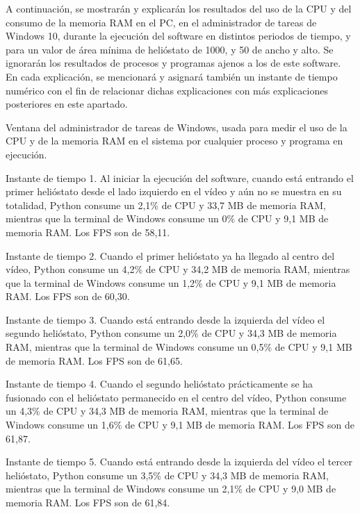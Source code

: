 \documentclass[12pt]{article}
\begin{document}
A continuación, se mostrarán y explicarán los resultados del uso de la CPU y del consumo de la memoria RAM en el PC, en el administrador de tareas de Windows 10, durante la ejecución del software en distintos periodos de tiempo, y para un valor de área mínima de helióstato de 1000, y 50 de ancho y alto. Se ignorarán los resultados de procesos y programas ajenos a los de este software. En cada explicación, se mencionará y asignará también un instante de tiempo numérico con el fin de relacionar dichas explicaciones con más explicaciones posteriores en este apartado.



Ventana del administrador de tareas de Windows, usada para medir el uso de la CPU y de la memoria RAM en el sistema por cualquier proceso y programa en ejecución.




Instante de tiempo 1. Al iniciar la ejecución del software, cuando está entrando el primer helióstato desde el lado izquierdo en el vídeo y aún no se muestra en su totalidad, Python consume un 2,1\% de CPU y 33,7 MB de memoria RAM, mientras que la terminal de Windows consume un 0\% de CPU y 9,1 MB de memoria RAM. Los FPS son de 58,11.




Instante de tiempo 2. Cuando el primer helióstato ya ha llegado al centro del vídeo, Python consume un 4,2\% de CPU y 34,2 MB de memoria RAM, mientras que la terminal de Windows consume un 1,2\% de CPU y 9,1 MB de memoria RAM. Los FPS son de 60,30.




Instante de tiempo 3. Cuando está entrando desde la izquierda del vídeo el segundo helióstato, Python consume un 2,0\% de CPU y 34,3 MB de memoria RAM, mientras que la terminal de Windows consume un 0,5\% de CPU y 9,1 MB de memoria RAM. Los FPS son de 61,65.




Instante de tiempo 4. Cuando el segundo helióstato prácticamente se ha fusionado con el helióstato permanecido en el centro del vídeo, Python consume un 4,3\% de CPU y 34,3 MB de memoria RAM, mientras que la terminal de Windows consume un 1,6\% de CPU y 9,1 MB de memoria RAM. Los FPS son de 61,87.




Instante de tiempo 5. Cuando está entrando desde la izquierda del vídeo el tercer helióstato, Python consume un 3,5\% de CPU y 34,3 MB de memoria RAM, mientras que la terminal de Windows consume un 2,1\% de CPU y 9,0 MB de memoria RAM. Los FPS son de 61,84.
\end{document}
